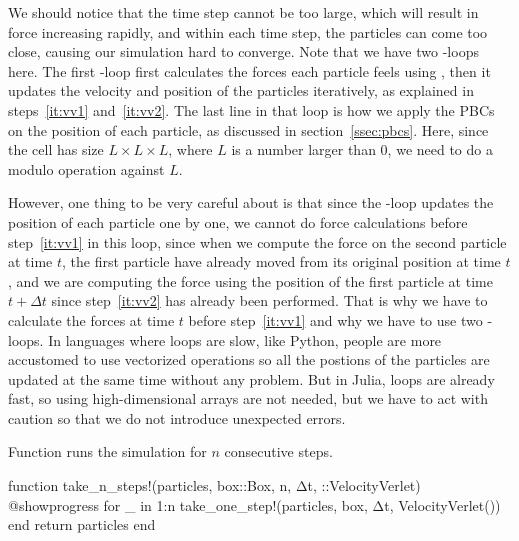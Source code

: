 We should notice that the time step cannot be too large, which will result in force
increasing rapidly, and within each time step, the particles can come too close,
causing our simulation hard to converge.
Note that we have two -loops here. The first -loop first calculates
the forces each particle feels using , then it updates
the velocity and position of the particles iteratively, as explained in steps~\ref{it:vv1}
and~\ref{it:vv2}.
The last line in that loop is how we apply the PBCs on the position of each particle,
as discussed in section~\ref{ssec:pbcs}.
Here, since the cell has size $L \times L \times L$, where $L$ is a number larger than
$0$, we need to do a modulo operation against $L$.

However, one thing to be very careful about is that since the -loop updates
the position of each particle one by one, we cannot do force calculations before
step~\ref{it:vv1} in this loop,
since when we compute the force on the second particle at time $t$, the first particle
have already moved from its original position at time $t$, and we are computing the force
using the position of the first particle at time $t + \Delta t$ since step~\ref{it:vv2}
has already been performed.
That is why we have to calculate the forces at time $t$ before step~\ref{it:vv1} and
why we have to use two -loops.
In languages where loops are slow, like Python, people are more accustomed to use
vectorized operations so all the postions of the particles are updated at the same time
without any problem.
But in Julia, loops are already fast, so using high-dimensional arrays are not needed,
but we have to act with caution so that we do not introduce unexpected errors.

\begin{algorithm}
    \caption{Function  runs the simulation for $n$ consecutive steps.}
    \label{lst:take_n_steps}
    \begin{juliacode}
        function take_n_steps!(particles, box::Box, n, Δt, ::VelocityVerlet)
            @showprogress for _ in 1:n
                take_one_step!(particles, box, Δt, VelocityVerlet())
            end
            return particles
        end
    \end{juliacode}
\end{algorithm}

